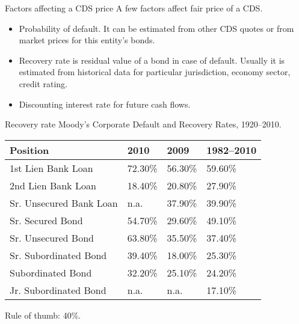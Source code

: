 \documentclass{beamer}
\begin{document}
\begin{frame}{Factors affecting a CDS price}
\justify
A few factors affect fair price of a CDS.
\begin{itemize}
\justifying
\item Probability of default. It can be estimated from other CDS quotes or from market prices for this entity's bonds.
\item Recovery rate is residual value of a bond in case of default. Usually it is estimated from historical data for particular jurisdiction, economy sector, credit rating.
\item Discounting interest rate for future cash flows.
\end{itemize}
\end{frame}



\begin{frame}{Recovery rate}
\justify
Moody's Corporate Default and Recovery Rates, 1920--2010.

\vspace{\baselineskip}
\begin{tabular}{l|l|l|l}
Position						& 2010		& 2009		& 1982--2010 \\
\hline
1st	Lien Bank Loan	 		& 72.30\%	& 56.30\% & 59.60\% \\
2nd Lien Bank Loan 		& 18.40\%	& 20.80\% & 27.90\% \\
Sr. Unsecured	Bank Loan	& n.a.		& 37.90\% & 39.90\% \\
Sr. Secured Bond			& 54.70\%	& 29.60\% & 49.10\%	 \\
\hline
Sr. Unsecured	Bond		& 63.80\%	& 35.50\% & 37.40\%	 \\
\hline
Sr. Subordinated Bond	& 39.40\%	& 18.00\% & 25.30\%	\\
Subordinated Bond		& 32.20\%	& 25.10\% & 24.20\%	\\
Jr. Subordinated Bond	 	& n.a.		& n.a.		&17.10\%	\\
\end{tabular}

\justify
Rule of thumb: 40\%.
\end{frame}
\end{document}

